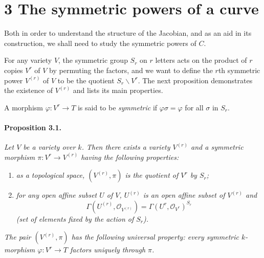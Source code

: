 

\section*{3 \quad The symmetric powers of a curve}

Both in order to understand the structure of the Jacobian, and as an aid in
its construction, we shall need to study the symmetric powers of $C$.

For any variety $V$, the symmetric group $S_r$ on $r$ letters acts on the
product of $r$ copies $V^r$ of $V$ by permuting the factors, and we want to
define the $r$th symmetric power $V^{(r)}$ of $V$ to be the quotient
$S_r \backslash V^r$. The next proposition demonstrates the existence of
$V^{(r)}$ and lists its main properties.

A morphism $\varphi \colon V^r \to T$ is said to be \textit{symmetric} if
$\varphi\sigma = \varphi$ for all $\sigma$ in $S_r$.

\paragraph{Proposition 3.1.}
\textit{Let $V$ be a variety over $k$. Then there exists a variety $V^{(r)}$
and a symmetric morphism $\pi \colon V^r \to V^{(r)}$ having the following
properties:}

\begin{enumerate}
\item[(a)] \textit{as a topological space, $(V^{(r)}, \pi)$ is the quotient
of $V^r$ by $S_r$;}
\item[(b)] \textit{for any open affine subset $U$ of $V$, $U^{(r)}$ is an
open affine subset of $V^{(r)}$ and}
\[
  \Gamma(U^{(r)}, \mathcal{O}_{V^{(r)}})
  = \Gamma(U^r, \mathcal{O}_{V^r})^{S_r}
\]
\textit{(set of elements fixed by the action of $S_r$).}
\end{enumerate}

\textit{The pair $(V^{(r)}, \pi)$ has the following universal property:
every symmetric $k$-morphism $\varphi \colon V^r \to T$ factors uniquely
through $\pi$.}

